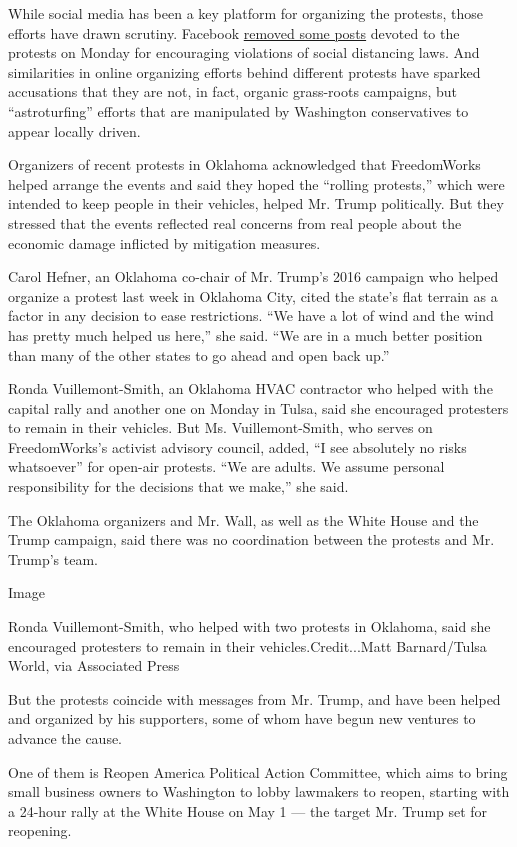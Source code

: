 While social media has been a key platform for organizing the protests,
those efforts have drawn scrutiny. Facebook
\href{https://www.cnn.com/2020/04/20/politics/facebook-covid-shutdown-protests/index.html}{removed
some posts} devoted to the protests on Monday for encouraging violations
of social distancing laws. And similarities in online organizing efforts
behind different protests have sparked accusations that they are not, in
fact, organic grass-roots campaigns, but ``astroturfing'' efforts that
are manipulated by Washington conservatives to appear locally driven.

Organizers of recent protests in Oklahoma acknowledged that FreedomWorks
helped arrange the events and said they hoped the ``rolling protests,''
which were intended to keep people in their vehicles, helped Mr. Trump
politically. But they stressed that the events reflected real concerns
from real people about the economic damage inflicted by mitigation
measures.

Carol Hefner, an Oklahoma co-chair of Mr. Trump's 2016 campaign who
helped organize a protest last week in Oklahoma City, cited the state's
flat terrain as a factor in any decision to ease restrictions. ``We have
a lot of wind and the wind has pretty much helped us here,'' she said.
``We are in a much better position than many of the other states to go
ahead and open back up.''

Ronda Vuillemont-Smith, an Oklahoma HVAC contractor who helped with the
capital rally and another one on Monday in Tulsa, said she encouraged
protesters to remain in their vehicles. But Ms. Vuillemont-Smith, who
serves on FreedomWorks's activist advisory council, added, ``I see
absolutely no risks whatsoever'' for open-air protests. ``We are adults.
We assume personal responsibility for the decisions that we make,'' she
said.

The Oklahoma organizers and Mr. Wall, as well as the White House and the
Trump campaign, said there was no coordination between the protests and
Mr. Trump's team.

Image

Ronda Vuillemont-Smith, who helped with two protests in Oklahoma, said
she encouraged protesters to remain in their vehicles.Credit...Matt
Barnard/Tulsa World, via Associated Press

But the protests coincide with messages from Mr. Trump, and have been
helped and organized by his supporters, some of whom have begun new
ventures to advance the cause.

One of them is Reopen America Political Action Committee, which aims to
bring small business owners to Washington to lobby lawmakers to reopen,
starting with a 24-hour rally at the White House on May 1 --- the target
Mr. Trump set for reopening.

